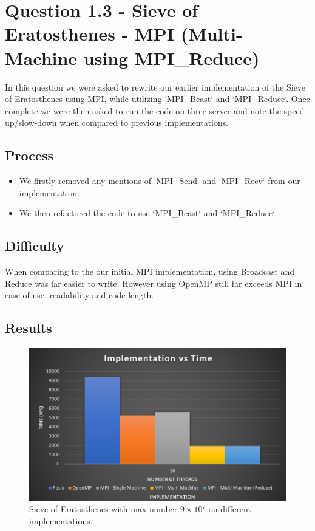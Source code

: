 \section*{Question 1.3 - Sieve of Eratosthenes - MPI (Multi-Machine using MPI\_Reduce)}

In this question we were asked to rewrite our earlier implementation of the 
Sieve of Eratosthenes using MPI, while utilizing `MPI\_Bcast` and `MPI\_Reduce`. 
Once complete we were then asked to run the code on three server and note the 
speed-up/slow-down when compared to previous implementations.

\subsection*{Process}

\begin{itemize}
    \item We firstly removed any mentions of `MPI\_Send` and `MPI\_Recv` from our 
    implementation.
    \item We then refactored the code to use `MPI\_Bcast` and `MPI\_Reduce`
\end{itemize}

\subsection*{Difficulty}

When comparing to the our initial MPI implementation, using Broadcast and Reduce 
was far easier to write. However using OpenMP still far exceeds MPI in ease-of-use, 
readability and code-length.

\subsection*{Results}

\begin{figure}
    \centering
    \includegraphics[width=\linewidth]{Figures/mpi_Bcast.png}
    \caption{Sieve of Eratosthenes with max number $9\times10^7$ on different
    implementations.}
    \label{fig:sievebcast}
\end{figure}

